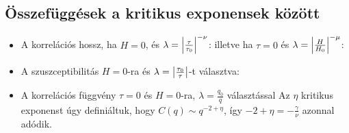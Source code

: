   \subsection{Összefüggések a kritikus exponensek között}
   \begin{itemize}
    \item A korrelációs hossz, ha $H=0$, és $\lambda=\left\lvert\frac{\tau}{\tau_0}\right\rvert^{-\nu}$:
    illetve ha $\tau=0$ és $\lambda=\left\lvert\frac{H}{H_0}\right\rvert^{-\mu}$:
    
    \item A szuszceptibilitás $H=0$-ra és $\lambda=\left\lvert\frac{\tau_0}{\tau}\right\rvert$-t választva:
    
    \item A korrelációs függvény $\tau=0$ és $H=0$-ra, $\lambda=\frac{q_0}{q}$ választással
    Az $\eta$ kritikus exponenst úgy definiáltuk, hogy $C(q)\sim q^{-2+\eta}$, így $-2+\eta=-\frac{\gamma}{\nu}$ azonnal adódik.
    

\end{itemize}
